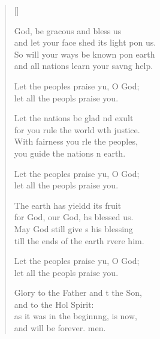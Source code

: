 \settowidth{\versewidth}{and let your face shed its light upon us.}
\begin{verse}[\versewidth]
  \begin{patverse}
 God, be grac\pointup{\i}ous and bless us\Med\\
and let your face shed its light pon us.\\
So will your ways be known pon earth\Med\\
and all nations learn your sav\pointup{\i}ng help.

Let the peoples praise yu, O God;\Med\\
let all the peopls praise you.

Let the nations be glad nd exult\Med\\
for you rule the world w\pointup{\i}th justice.\\
With fairness you rle the peoples,\Med\\
you guide the nations n earth.

Let the peoples praise yu, O God;\Med\\
let all the peopls praise you.

The earth has yieldd its fruit\Med\\
for God, our God, hs blessed us.\\
May God still give s his blessing\Med\\
till the ends of the earth rvere him.

Let the peoples praise yu, O God;\Med\\
let all the peopls praise you.

Glory to the Father and t the Son,\Med\\
and to the Hol Spirit:\\
as it was in the beginn\pointup{\i}ng, is now,\Med\\
and will be forever. men.
  \end{patverse}
\end{verse}
